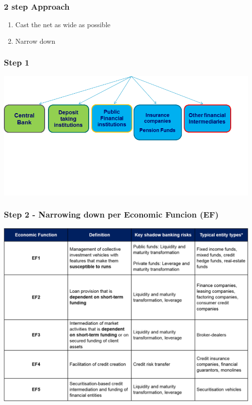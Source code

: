 \documentclass[11pt]{beamer}
\begin{document}
\begin{frame}
\frametitle{2 step Approach}
\begin{enumerate}
\item Cast the net as wide as possible
\item Narrow down
\end{enumerate}
\end{frame}

\begin{frame}
\frametitle{Step 1}
\includegraphics[width=\textwidth]{shadowbank3.png}
\end{frame}


\begin{frame}
\frametitle{Step 2 - Narrowing down per Economic Funcion (EF)}
\includegraphics[width=\textwidth]{shadowbank4.png}
\end{frame}
\end{document}
